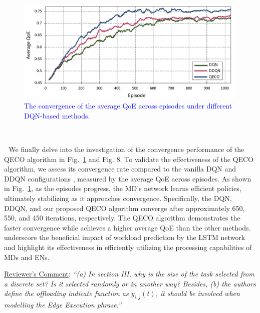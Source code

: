 \documentclass[12pt,draftclsnofoot,onecolumn]{IEEEtran}
\newcommand{\rev}[1]{{\color{blue}#1}} %
\newcommand{\rev}[1]{#1}
\newenvironment{my}[2]%
{\begin{list}{}%
{\setlength{\rightmargin}{#1}\setlength{\leftmargin}{#2}}%


 \item[]{}

} {\end{list}}
\begin{document}
\begin{enumerate}
 



\setcounter{figure}{6}

\begin{figure}[H]
	\captionsetup{name=Fig.}
	\centering
	\includegraphics[width=.6\linewidth]{m1}
	\vspace*{-3mm}
	\caption{\textcolor{blue}{The convergence of the average QoE across episodes under different DQN-based methods.}}
	\vspace*{-3mm}
	\label{chart000}
\end{figure}

		\begin{my}{1cm}{1cm}
	\rev{
		{\

	\,\,\,\,We finally delve into the investigation of the convergence performance of the QECO algorithm in Fig.~\ref{chart000} and Fig. 8. To validate the effectiveness of the QECO algorithm, we assess its convergence rate compared to the vanilla DQN and DDQN configurations \cite{van2016deep}, measured by the average QoE across episodes. As shown in Fig.~\ref{chart000}, as the episodes progress, the MD's network learns efficient policies, ultimately stabilizing as it approaches convergence. Specifically, the DQN, DDQN, and our proposed QECO algorithm converge after approximately 650, 550, and 450 iterations, respectively. The QECO algorithm demonstrates the faster convergence while achieves a higher average QoE than the other methods. underscore the beneficial impact of workload prediction by the LSTM network and highlight its effectiveness in efficiently utilizing the processing capabilities of  MDs and ENs.
}}
\end{my}


\vspace{6mm}

\item \underline{Reviewer's Comment}: 
\textit{``(a) In section III, why is the size of the task selected from a discrete set? Is it selected randomly or in another way? Besides, (b) the authors define the offloading indicate function as $y_{i,j}(t)$, it should be involved when modelling the Edge Execution phrase.''} \newline


\end{enumerate}
\end{document}
